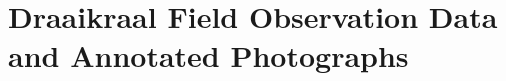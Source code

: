 %
%
%

\chapter{Draaikraal Field Observation Data and Annotated Photographs}
\label{app:bushveld}
\label{app:draaikraal-field-data}


